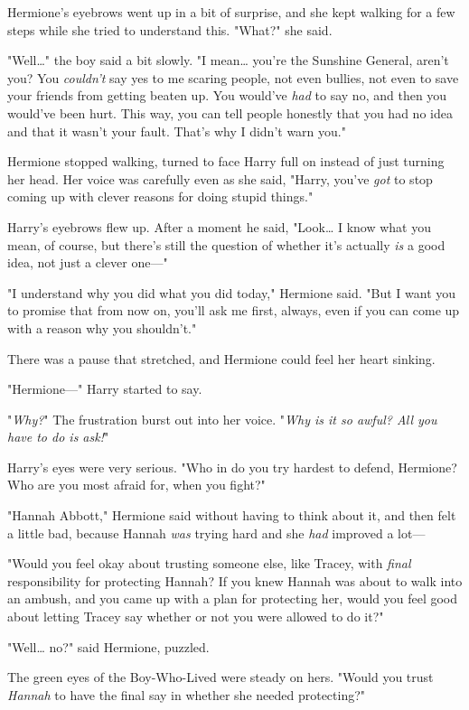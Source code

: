 Hermione's eyebrows went up in a bit of surprise, and she kept walking for a
few steps while she tried to understand this. "What?" she said.

"Well{\ldots}" the boy said a bit slowly. "I mean{\ldots} you're the Sunshine
General, aren't you? You \emph{couldn't} say yes to me scaring people, not even
bullies, not even to save your friends from getting beaten up. You would've
\emph{had} to say no, and then you would've been hurt. This way, you can tell
people honestly that you had no idea and that it wasn't your fault. That's why
I didn't warn you."

Hermione stopped walking, turned to face Harry full on instead of just turning
her head. Her voice was carefully even as she said, "Harry, you've \emph{got}
to stop coming up with clever reasons for doing stupid things."

Harry's eyebrows flew up. After a moment he said, "Look{\ldots} I know what you
mean, of course, but there's still the question of whether it's actually
\emph{is} a good idea, not just a clever one---"

"I understand why you did what you did today," Hermione said. "But I want you
to promise that from now on, you'll ask me first, always, even if you can come
up with a reason why you shouldn't."

There was a pause that stretched, and Hermione could feel her heart sinking.

"Hermione---" Harry started to say.

"\emph{Why?}" The frustration burst out into her voice. "\emph{Why is it so
awful? All you have to do is ask!}"

Harry's eyes were very serious. "Who in \SPHEW do you try hardest to
defend, Hermione? Who are you most afraid for, when you fight?"

"Hannah Abbott," Hermione said without having to think about it, and then felt
a little bad, because Hannah \emph{was} trying hard and she \emph{had} improved
a lot---

"Would you feel okay about trusting someone else, like Tracey, with
\emph{final} responsibility for protecting Hannah? If you knew Hannah was about
to walk into an ambush, and you came up with a plan for protecting her, would
you feel good about letting Tracey say whether or not you were allowed to do
it?"

"Well{\ldots} no?" said Hermione, puzzled.

The green eyes of the Boy-Who-Lived were steady on hers. "Would you trust
\emph{Hannah} to have the final say in whether she needed protecting?"

